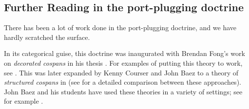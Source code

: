 \documentclass[DynamicalBook]{subfiles}
\begin{document}
\subsection{Further Reading in the port-plugging doctrine}

There has been a lot of work done in the port-plugging doctrine, and we have hardly scratched the surface.

In its categorical guise, this doctrine was inaugurated with Brendan Fong's work on \emph{decorated cospans} in his thesis \cite{Fong:Thesis}. For examples of putting this theory to work, see \cite{baez2018compositional, baez2016compositional, baez2017compositional}. This was later expanded by Kenny Courser and John Baez to a theory of \emph{structured cospans} in \cite{Baez.Courser:Structured.Cospans} (see \cite{Baez.Courser.Vasilakopolou:Structured.vs.Decorated} for a detailed comparison between these approaches). John Baez and his students have used these theories in a variety of settings; see for example \cite{Baez.Master:Open.Petri.Nets, Baez.Courser:Open.Markov.Processes}.
\end{document}

